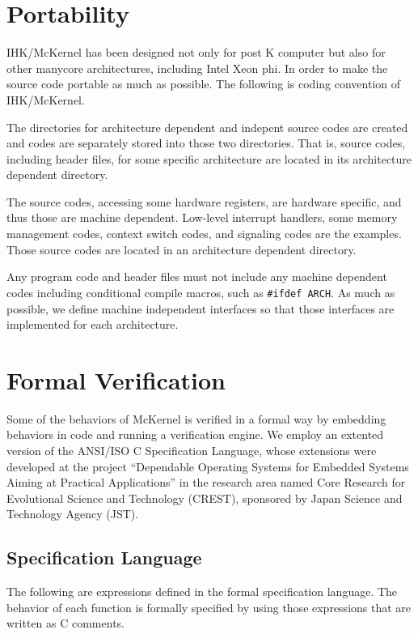 \documentclass[twoside,11pt,fleqn]{book}
\begin{document}
\section{Portability}

IHK/McKernel has been designed not only for post K computer but also
for other manycore architectures, including Intel Xeon phi.
In order to make the source code portable as much as possible.
The following is coding convention of IHK/McKernel.

The directories for architecture dependent and indepent source codes are
created and codes are separately stored into those two directories.
That is, source codes, including header files, for some specific
architecture are located in its architecture dependent directory.

The source codes, accessing some hardware registers, are hardware
specific, and thus those are machine dependent.  Low-level interrupt
handlers, some memory management codes, context switch codes, and
signaling codes are the examples. Those source codes are located in an
architecture dependent directory.

Any program code and header files must not include any machine
dependent codes including conditional compile macros, such as
\verb+#ifdef ARCH+.
As much as possible, we define machine independent interfaces so that
those interfaces are implemented for each architecture.

\section{Formal Verification}

Some of the behaviors of McKernel is verified in a formal way by embedding behaviors in code and running a verification engine.
We employ an extented version of the ANSI/ISO C Specification Language,
whose extensions\cite{pbus} were developed at the project ``Dependable Operating
Systems for Embedded Systems Aiming at Practical Applications'' in the
research area named Core Research for Evolutional Science and
Technology (CREST), sponsored by Japan Science and Technology Agency
(JST).

\subsection{Specification Language}
The following are expressions defined in the formal specification language.
The behavior of each function is formally specified by using those
expressions that are written as C comments.
\end{document}
